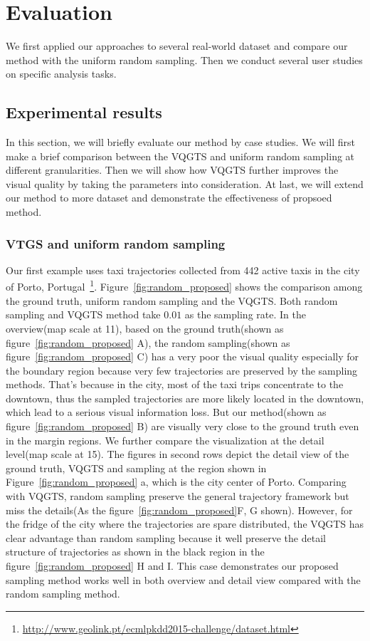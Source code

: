 \section{Evaluation}
We first applied our approaches to several real-world dataset and compare our method with the uniform random sampling. Then we conduct several user studies on specific analysis tasks. 
\subsection{Experimental results}
In this section, we will briefly evaluate our method by case studies. We will first make a brief comparison between the VQGTS and uniform random sampling at different granularities. Then we will show how VQGTS further improves the visual quality by taking the  parameters into consideration. At last, we will extend our method to more dataset and demonstrate the effectiveness of propsoed method.
\subsubsection{VTGS and uniform random sampling}
Our first example uses taxi trajectories collected from 442 active taxis in the city of Porto, Portugal~\footnote{\url{http://www.geolink.pt/ecmlpkdd2015-challenge/dataset.html}}. Figure~\ref{fig:random_proposed} shows the comparison among the ground truth, uniform random sampling and the VQGTS. Both random sampling and VQGTS method take $0.01$ as the sampling rate. 
In the overview(map scale at 11), based on the ground truth(shown as figure~\ref{fig:random_proposed} A), the random sampling(shown as figure~\ref{fig:random_proposed} C) has a very poor the visual quality especially for the boundary region because very few trajectories are preserved by the sampling methods. That's because in the city, most of the taxi trips concentrate to the downtown, thus the sampled trajectories are more likely located in the downtown, which lead to a serious visual information loss.  
But our method(shown as figure~\ref{fig:random_proposed} B) are visually very close to the ground truth even in the margin regions. 
We further compare the visualization at the detail level(map scale at 15).
The figures in second rows depict the detail view of the ground truth, VQGTS and sampling at the region shown in Figure~\ref{fig:random_proposed} a, which is the city center of Porto. Comparing with VQGTS, random sampling preserve the general trajectory framework but miss the details(As the figure~\ref{fig:random_proposed}F, G shown). However, for the fridge of the city where the trajectories are spare distributed, the VQGTS has clear advantage than random sampling because it well preserve the detail structure of trajectories as shown in the black region in the figure~\ref{fig:random_proposed} H and I. This case demonstrates our proposed sampling method works well in both overview and detail view compared with the random sampling method.

